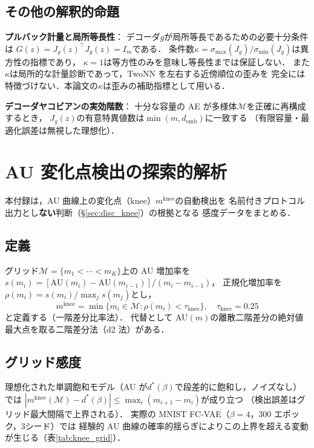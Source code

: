 \documentclass[11pt,a4paper]{jsarticle}
\newcommand{\Jg}{J_g}
\newcommand{\kap}{\kappa}
\newcommand{\demb}{d_{\mathrm{emb}}}
\newcommand{\mknee}{m^{\mathrm{knee}}}
\newcommand{\dstar}{d^{*}(\beta)}
\begin{document}
\subsection{その他の解釈的命題}

\textbf{プルバック計量と局所等長性}：
デコーダ$g$が局所等長であるための必要十分条件は
$G(z) = \Jg(z)^\top \Jg(z) = I_m$である．
条件数$\kap = \sigma_{\max}(\Jg)/\sigma_{\min}(\Jg)$は異方性の指標であり，
$\kap = 1$は等方性のみを意味し等長性までは保証しない．
また$\kap$は局所的な計量診断であって，TwoNN を左右する近傍順位の歪みを
完全には特徴づけない．本論文の$\kap$は歪みの補助指標として用いる．

\textbf{デコーダヤコビアンの実効階数}：
十分な容量の AE が多様体$\mathcal{M}$を正確に再構成するとき，
$\Jg(z)$の有意特異値数は$\min(m, \demb)$に一致する
（有限容量・最適化誤差は無視した理想化）．

\section{AU 変化点検出の探索的解析}\label{app:knee}

本付録は，AU 曲線上の変化点（knee）$\mknee$の自動検出を
名前付きプロトコル出力とし\textbf{ない}判断（§\ref{sec:disc_knee}）の根拠となる
感度データをまとめる．

\subsection{定義}

グリッド$\mathcal{M} = \{m_1 < \cdots < m_K\}$上の AU 増加率を
$s(m_i) = [\mathrm{AU}(m_i) - \mathrm{AU}(m_{i-1})] / (m_i - m_{i-1})$，
正規化増加率を$\rho(m_i) = s(m_i) / \max_j s(m_j)$とし，
\begin{equation}
  \mknee = \min\{m_i \in \mathcal{M} : \rho(m_i) < \tau_{\mathrm{knee}}\},
  \quad \tau_{\mathrm{knee}} = 0.25
  \label{eq:mknee}
\end{equation}
と定義する（一階差分比率法）．
代替として AU$(m)$の離散二階差分の絶対値最大点を取る二階差分法（d2 法）がある．

\subsection{グリッド感度}

理想化された単調飽和モデル（AU が$\dstar$で段差的に飽和し，ノイズなし）では
$|\mknee(\mathcal{M}) - \dstar| \leq \max_i (m_{i+1} - m_i)$が成り立つ
（検出誤差はグリッド最大間隔で上界される）．
実際の MNIST FC-VAE（$\beta = 4$，300 エポック，3シード）では
経験的 AU 曲線の確率的揺らぎによりこの上界を超える変動が生じる（表\ref{tab:knee_grid}）．
\end{document}
